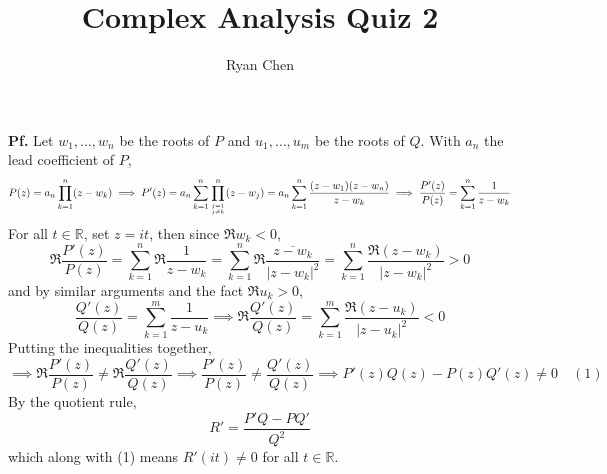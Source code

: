 \documentclass{article}
\title{Complex Analysis Quiz 2}
\author{Ryan Chen}
\def\mbb#1{\mathbb{#1}}
\def\tbf#1{\textbf{#1}}
\def\bR{\mbb{R}}
\newcommand{\pf}{\tbf{Pf. }}
\newcommand{\imp}{\implies}
\renewcommand{\bar}{\overline}
\begin{document}
	
\maketitle

\pf Let $w_1,\dots,w_n$ be the roots of $P$ and $u_1,\dots,u_m$ be the roots of $Q$. With $a_n$ the lead coefficient of $P$,
$$P(z) = a_n\prod_{k=1}^n (z-w_k)
\imp P'(z) = a_n\sum_{k=1}^n\prod_{j=1\atop j\ne k}^n(z-w_j)
= a_n\sum_{k=1}^n\frac{(z-w_1)(z-w_n)}{z-w_k}
\imp \frac{P'(z)}{P(z)} = \sum_{k=1}^n\frac{1}{z-w_k}$$
For all $t\in\bR$, set $z=it$, then since $\Re w_k<0$,
$$\Re \frac{P'(z)}{P(z)} = \sum_{k=1}^n \Re\frac1{z-w_k}
= \sum_{k=1}^n \Re\frac{\bar{z-w_k}}{|z-w_k|^2}
= \sum_{k=1}^n\frac{\Re(z-w_k)}{|z-w_k|^2}
> 0$$
and by similar arguments and the fact $\Re u_k>0$,
$$\frac{Q'(z)}{Q(z)} = \sum_{k=1}^m\frac1{z-u_k}
\imp \Re\frac{Q'(z)}{Q(z)} = \sum_{k=1}^m\frac{\Re(z-u_k)}{|z-u_k|^2}
< 0$$
Putting the inequalities together,
$$\imp \Re \frac{P'(z)}{P(z)} \ne \Re\frac{Q'(z)}{Q(z)}
\imp \frac{P'(z)}{P(z)} \ne \frac{Q'(z)}{Q(z)}
\imp P'(z)Q(z)-P(z)Q'(z) \ne 0\quad (1)$$
By the quotient rule,
$$R'=\frac{P'Q-PQ'}{Q^2}$$
which along with (1) means $R'(it)\ne0$ for all $t\in\bR$.
	
\end{document}
